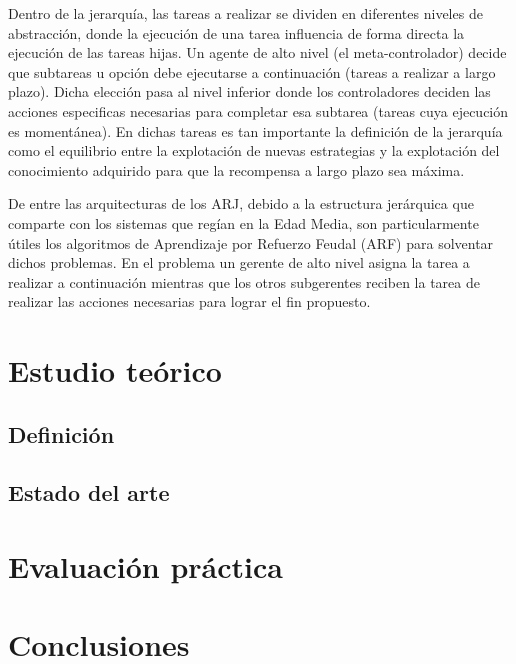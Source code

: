 \documentclass[letterpaper]{article} %
\begin{document}
Dentro de la jerarquía, las tareas a realizar se dividen en diferentes niveles de abstracción, donde la ejecución de una tarea influencia de forma directa la ejecución de las tareas hijas. Un agente de alto nivel (el meta-controlador) decide que subtareas u opción debe ejecutarse a continuación (tareas a realizar a largo plazo). Dicha elección pasa al nivel inferior donde los controladores deciden las acciones especificas necesarias para completar esa subtarea (tareas cuya ejecución es momentánea). En dichas tareas es tan importante la definición de la jerarquía como el equilibrio entre la explotación de nuevas estrategias y la explotación del conocimiento adquirido para que la recompensa a largo plazo sea máxima.

De entre las arquitecturas de los ARJ, debido a la estructura jerárquica que comparte con los sistemas que regían en la Edad Media, son particularmente útiles los algoritmos de Aprendizaje por Refuerzo Feudal (ARF) para solventar dichos problemas. En el problema un gerente de alto nivel asigna la tarea a realizar a continuación mientras que los otros subgerentes reciben la tarea de realizar las acciones necesarias para lograr el fin propuesto.
\cite {geeksforgeeks2024hrl,sutton1999between,barto2003recent,dietterich2000hierarchical}
\section{Estudio teórico}

\subsection{Definición}

\subsection{Estado del arte}

\section{Evaluación práctica}

\section{Conclusiones}






\end{document}
